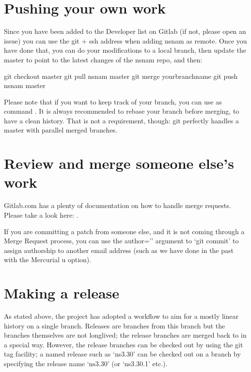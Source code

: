 \documentclass[letterpaper,10pt,english]{sphinxmanual}
\renewcommand{\sphinxcode}[1]{\texttt{\small{#1}}}
\begin{document}
\section{Pushing your own work}
\label{\detokenize{working-with-git:pushing-your-own-work}}
Since you have been added to the Developer list on Gitlab (if not, please open an issue) you can use the git + ssh address when adding nsnam as remote. Once you have done that, you can do your modifications to a local branch, then update the master to point to the latest changes of the nsnam repo, and then:

\begin{sphinxVerbatim}[commandchars=\\\{\}]
\PYGZdl{} git checkout master
\PYGZdl{} git pull nsnam master
\PYGZdl{} git merge \PYG{o}{[}your\PYGZus{}branch\PYGZus{}name\PYG{o}{]}
\PYGZdl{} git push nsnam master
\end{sphinxVerbatim}

Please note that if you want to keep track of your branch, you can use as command \sphinxcode{\sphinxupquote{git merge \sphinxhyphen{}\sphinxhyphen{}no\sphinxhyphen{}ff {[}your\_branch\_name{]}}}. It is always recommended to rebase your branch before merging, to have a clean history. That is not a requirement, though: git perfectly handles a master with parallel merged branches.


\section{Review and merge someone else’s work}
\label{\detokenize{working-with-git:review-and-merge-someone-else-s-work}}
Gitlab.com has a plenty of documentation on how to handle merge requests. Please take a look here: .

If you are committing a patch from someone else, and it is not coming through a Merge Request process, you can use the \textendash{}author=’’ argument to ‘git commit’ to assign authorship to another email address (such as we have done in the past with the Mercurial \sphinxhyphen{}u option).


\section{Making a release}
\label{\detokenize{working-with-git:making-a-release}}
As stated above, the project has adopted a workflow to aim for a mostly
linear history on a single \sphinxcode{} branch.  Releases are branches from
this \sphinxcode{} branch but the branches themselves are not long\sphinxhyphen{}lived;
the release branches are merged back to \sphinxcode{} in a special way.  However,
the release branches can be checked out by using the git tag facility;
a named release such as ‘ns\sphinxhyphen{}3.30’ can be checked out on a branch by specifying
the release name ‘ns\sphinxhyphen{}3.30’ (or ‘ns\sphinxhyphen{}3.30.1’ etc.).
\end{document}
